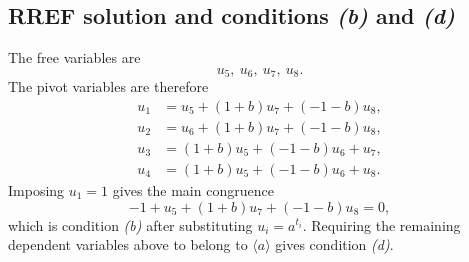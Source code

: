\documentclass[11pt]{article}
\newcommand{\SpanA}{\langle a\rangle}
\begin{document}
\subsection{RREF solution and conditions \emph{(b)} and \emph{(d)}}
The free variables are
\[
u_{5},\ u_{6},\ u_{7},\ u_{8}.
\]
The pivot variables are therefore
\[
\begin{aligned}
u_{1}&=u_{5} + \left(1 + b\right)u_{7} + \left(-1 - b\right)u_{8},\\
u_{2}&=u_{6} + \left(1 + b\right)u_{7} + \left(-1 - b\right)u_{8},\\
u_{3}&=\left(1 + b\right)u_{5} + \left(-1 - b\right)u_{6} + u_{7},\\
u_{4}&=\left(1 + b\right)u_{5} + \left(-1 - b\right)u_{6} + u_{8}.
\end{aligned}
\]
Imposing $u_1=1$ gives the main congruence
\[
-1 + u_{5} + \left(1 + b\right)u_{7} + \left(-1 - b\right)u_{8}=0,
\]
which is condition \emph{(b)} after substituting $u_i=a^{t_i}$.  Requiring the remaining dependent variables above to belong to $\SpanA$ gives condition \emph{(d)}.
\end{document}
